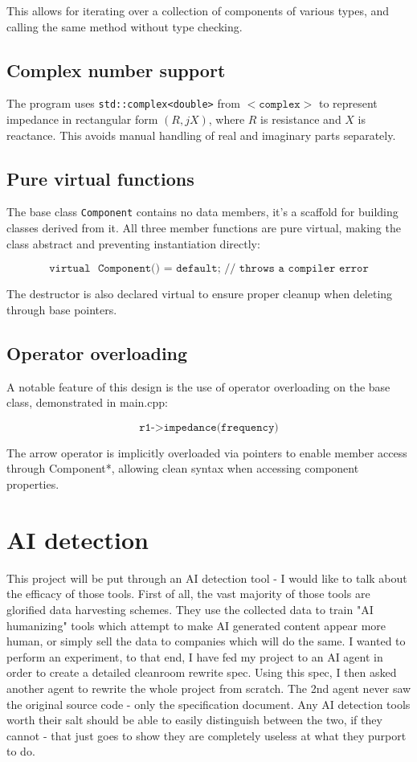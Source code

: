 \documentclass{article}
\begin{document}
    This allows for iterating over a collection of components of various types, and calling the same method without type checking.

    \subsection{Complex number support}
    The program uses \texttt{std::complex<double>} from $<\texttt{complex}>$ to represent impedance in rectangular form $(R, jX)$, where $R$ is resistance and $X$ is reactance.
    This avoids manual handling of real and imaginary parts separately.

    \subsection{Pure virtual functions}
    The base class \texttt{Component} contains no data members, it's a scaffold for building classes derived from it. All three member functions are pure virtual, making the class abstract and preventing instantiation directly:
    
    \begin{equation*}
        \texttt{virtual ~Component() = default; // throws a compiler error}
    \end{equation*}

    The destructor is also declared virtual to ensure proper cleanup when deleting through base pointers.

    \subsection{Operator overloading}
    A notable feature of this design is the use of operator overloading on the base class, demonstrated in main.cpp:

    \begin{equation*}
        \texttt{r1->impedance(frequency)}
    \end{equation*}

    The arrow operator is implicitly overloaded via pointers to enable member access through Component*, allowing clean syntax when accessing component properties. 

    \section{AI detection}
    This project will be put through an AI detection tool - I would like to talk about the efficacy of those tools.
    First of all, the vast majority of those tools are glorified data harvesting schemes.
    They use the collected data to train "AI humanizing" tools which attempt to make AI generated content appear more human, or simply sell the data to companies which will do the same.
    I wanted to perform an experiment, to that end, I have fed my project to an AI agent in order to create a detailed cleanroom rewrite spec. Using this spec, I then asked another agent to rewrite the whole project from scratch.
    The 2nd agent never saw the original source code - only the specification document. 
    Any AI detection tools worth their salt should be able to easily distinguish between the two, if they cannot - that just goes to show they are completely useless at what they purport to do.
\end{document}
